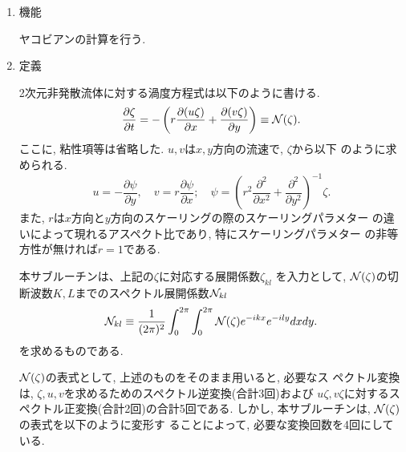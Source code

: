 \documentclass[a4j,fleqn]{jarticle}
\begin{document}
\begin{enumerate}

\item 機能 

ヤコビアンの計算を行う.

\item 定義

2次元非発散流体に対する渦度方程式は以下のように書ける.
\[
\frac{\partial\zeta}{\partial t}=
-\left(r\frac{\partial(u\zeta)}{\partial x}
       +\frac{\partial(v\zeta)}{\partial y}\right)
\equiv{\cal N}(\zeta).
\]
ここに, 粘性項等は省略した. $u,v$は$x,y$方向の流速で, $\zeta$から以下
のように求められる.
\[
u=-\frac{\partial\psi}{\partial y},\quad
v=r\frac{\partial\psi}{\partial x}; \quad
\psi=\left(r^2\frac{\partial^2}{\partial x^2}
           +\frac{\partial^2}{\partial y^2}\right)^{-1}\zeta.
\]
また, $r$は$x$方向と$y$方向のスケーリングの際のスケーリングパラメター
の違いによって現れるアスペクト比であり, 特にスケーリングパラメター
の非等方性が無ければ$r=1$である.

本サブルーチンは、上記の$\zeta$に対応する展開係数$\zeta_{kl}$
を入力として,
${\cal N}(\zeta)$の切断波数$K,L$までのスペクトル展開係数${\cal N}_{kl}$
\begin{equation}
{\cal N}_{kl}\equiv\frac1{(2\pi)^2}\int^{2\pi}_0\int^{2\pi}_0
{\cal N}(\zeta)e^{-ikx}e^{-ily}dxdy.
\end{equation}
を求めるものである. 

${\cal N}(\zeta)$の表式として, 上述のものをそのまま用いると, 必要なス
ペクトル変換は,
$\zeta,u,v$を求めるためのスペクトル逆変換(合計3回)および
$u\zeta,v\zeta$に対するスペクトル正変換(合計2回)の合計5回である.
しかし, 本サブルーチンは, ${\cal N}(\zeta)$の表式を以下のように変形す
ることによって, 必要な変換回数を4回にしている.


\end{enumerate}
\end{document}
